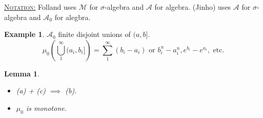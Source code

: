 \documentclass{report}
\newcommand{\fancyem}[1]{\underline{\textsc{#1}}}
\newtheorem{lemma}[theorem]{Lemma}
\theoremstyle{definition}
\newtheorem{example}[theorem]{Example}
\theoremstyle{remark}
\begin{document}
\fancyem{Notation:} Folland uses $\mathcal{M}$ for $\sigma$-algebra and $\mathcal{A}$ for algebra. (Jinho) uses $\mathcal{A}$ for $\sigma$-algebra and $\mathcal{A}_0$ for alegbra.

\begin{example}
$\mathcal{A}_0$ finite disjoint unions of $(a, b].$
\[
\mu_0\left( \bigcup_1^\infty (a_i, b_i]\right) = \sum_1^\infty (b_i - a_i) \text{ or $b_i^n - a_i^n, e^{b_i} - e^{a_i},$ etc.}
\]
\end{example}

\begin{lemma}
\begin{itemize}
\item (a) + (c) $\implies$ (b).
\item $\mu_0$ is monotone.
\end{itemize}
\end{lemma}
\end{document}
